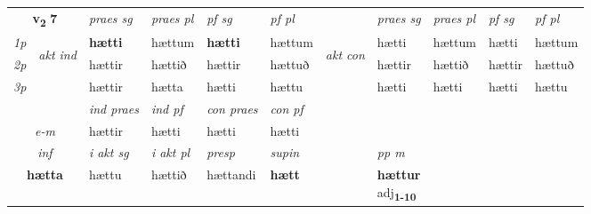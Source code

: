 \noindent
\begin{tabular}{lllllllllll} \toprule
\multicolumn{2}{c}{\textbf{v{\textsubscript{2}}} \Large{\textbf{7}}}  &  \textit{praes sg}  & \textit{praes pl}  &\textit{ pf sg} & \textit{pf pl} &  &  \textit{praes sg}  & \textit{praes pl}  & \textit{pf sg} & \textit{pf pl } \\*
	\cmidrule{3-6} \cmidrule{8-11}
 {\textit{1p}} & \multirow{3}{*}{\begin{turn}{90}\textit{akt ind}\end{turn}} & \textbf{hætti} & hættum & \textbf{hætti} & hættum & \multirow{3}{*}{\begin{turn}{90}\textit{akt con}\end{turn}} &hætti & hættum & hætti & hættum\\*
 {\textit{2p}} &  &  hættir  & hættið & hættir & hættuð & & hættir & hættið & hættir & hættuð \\*
{\textit{3p}} &  & hættir & hætta & hætti & hættu & & hætti & hætti& hætti & hættu \\*
\cmidrule{3-6} \cmidrule{8-11}

   & &  \textit{ind praes} & \textit{ind pf} & \textit{con praes} & \textit{con pf} \\*
\multicolumn{2}{c}{ \textit{e-m} } & hættir & hætti & hætti & hætti \\*

\cmidrule{3-8}
   \multicolumn{2}{c}{\textit{inf}}  & \textit{i akt sg} & \textit{i akt pl}   & \textit{presp} & \textit{supin}  && \textit{pp m} \\*
  \multicolumn{2}{c}{\textbf{hætta}} & hættu  & hættið   & hættandi &  \textbf{hætt}  && \specialcell{\textbf{hættur} \\ adj\textbf{\textsubscript{1-10}}} \\*
\end{tabular}

